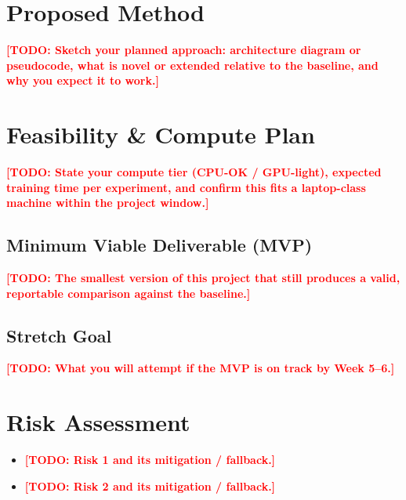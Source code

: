 \documentclass[11pt]{article}
\newcommand{\todo}[1]{\textcolor{red}{\textbf{[TODO: #1]}}}
\begin{document}
\section{Proposed Method}
\label{sec:method}
\todo{Sketch your planned approach: architecture diagram or pseudocode, what is novel
or extended relative to the baseline, and why you expect it to work.}

\section{Feasibility \& Compute Plan}
\label{sec:feasibility}
\todo{State your compute tier (CPU-OK / GPU-light), expected training time per
experiment, and confirm this fits a laptop-class machine within the project window.}

\subsection{Minimum Viable Deliverable (MVP)}
\todo{The smallest version of this project that still produces a valid, reportable
comparison against the baseline.}

\subsection{Stretch Goal}
\todo{What you will attempt if the MVP is on track by Week 5--6.}

\section{Risk Assessment}
\label{sec:risk}
\begin{itemize}[leftmargin=*]
  \item \todo{Risk 1 and its mitigation / fallback.}
  \item \todo{Risk 2 and its mitigation / fallback.}
\end{itemize}
\end{document}
